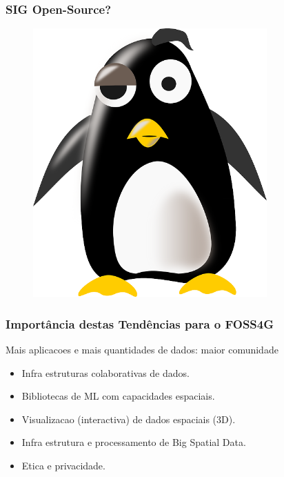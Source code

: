 \documentclass[hyperref={pdfpagelabels=true}]{beamer}
\begin{document}
\begin{frame}
\frametitle{SIG Open-Source?}

        \begin{figure}   
            \includegraphics[width=0.8\textwidth]{tux.png}
        \end{figure} 

\end{frame}



\begin{frame}
\frametitle{Import\^{a}ncia destas Tend\^{e}ncias para o FOSS4G}

    Mais aplicacoes e mais quantidades de dados: maior comunidade%
    \begin{itemize}
        \item<1->Infra estruturas colaborativas de dados.
        \item<2->Bibliotecas de ML com capacidades espaciais.
        \item<2->Visualizacao (interactiva) de dados espaciais (3D).
        \item<2->Infra estrutura e processamento de Big Spatial Data.
        \item<2->Etica e privacidade.%
    \end{itemize}                      

\end{frame}
\end{document}
